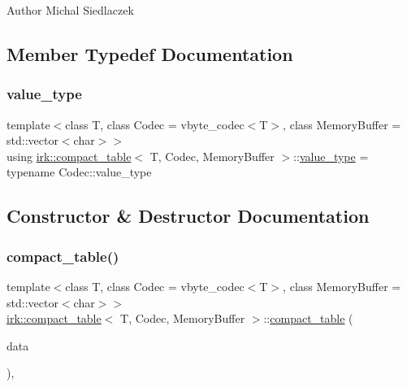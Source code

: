 \begin{DoxyAuthor}{Author}
Michal Siedlaczek 
\end{DoxyAuthor}


\subsection{Member Typedef Documentation}
\mbox{\label{classirk_1_1compact__table_accd2a370a48a5873af0625d56d732d71}} 
\subsubsection{\texorpdfstring{value\+\_\+type}{value\_type}}
{\footnotesize\ttfamily template$<$class T, class Codec = vbyte\+\_\+codec$<$\+T$>$, class Memory\+Buffer = std\+::vector$<$char$>$$>$ \\
using \mbox{\hyperlink{classirk_1_1compact__table}{irk\+::compact\+\_\+table}}$<$ T, Codec, Memory\+Buffer $>$\+::\mbox{\hyperlink{classirk_1_1compact__table_accd2a370a48a5873af0625d56d732d71}{value\+\_\+type}} =  typename Codec\+::value\+\_\+type}



\subsection{Constructor \& Destructor Documentation}
\mbox{\label{classirk_1_1compact__table_a7837dc73daa2b72450bca208a4a315bb}} 
\subsubsection{\texorpdfstring{compact\+\_\+table()}{compact\_table()}\hspace{0.1cm}{\footnotesize\ttfamily [1/3]}}
{\footnotesize\ttfamily template$<$class T, class Codec = vbyte\+\_\+codec$<$\+T$>$, class Memory\+Buffer = std\+::vector$<$char$>$$>$ \\
\mbox{\hyperlink{classirk_1_1compact__table}{irk\+::compact\+\_\+table}}$<$ T, Codec, Memory\+Buffer $>$\+::\mbox{\hyperlink{classirk_1_1compact__table}{compact\+\_\+table}} (\begin{DoxyParamCaption}\item[{Memory\+Buffer}]{data }\end{DoxyParamCaption})\hspace{0.3cm}{\ttfamily [inline]}, {\ttfamily [explicit]}}

